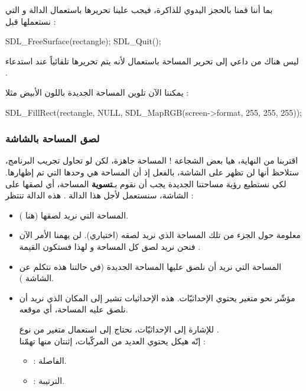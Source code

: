 بما أننا قمنا بالحجز اليدوي للذاكرة، فيجب علينا تحريرها باستعمال الدالة 
و التي نستعملها قبل 
 :

\begin{Csource}
SDL_FreeSurface(rectangle);
SDL_Quit();
\end{Csource}

\begin{information}
ليس هناك من داعي إلى تحرير المساحة
باستعمال
لأنه يتم تحريرها تلقائياً عند استدعاء
.
\end{information}

يمكننا الآن تلوين المساحة الجديدة باللون الأبيض مثلا :

\begin{Csource}
SDL_FillRect(rectangle, NULL, SDL_MapRGB(screen->format, 255, 255, 255));
\end{Csource}

\subsubsection{لصق المساحة بالشاشة}

اقتربنا من النهاية، هيا بعض الشجاعة ! المساحة جاهزة، لكن لو تحاول تجريب البرنامج، ستلاحظ أنها لن تظهر على الشاشة، بالفعل إذ أن المساحة
هي وحدها التي تم إظهارها. لكي نستطيع رؤية مساحتنا الجديدة يجب أن نقوم بـ\textbf{تسوية}
المساحة، أي لصقها على الشاشة، سنستعمل لأجل هذا الدالة 
.
 هذه الدالة تنتظر :
 
\begin{itemize}
	\item المساحة التي نريد لصقها (هنا 
	).
	\item معلومة حول الجزء من تلك المساحة الذي نريد لصقه (اختياري). لن يهمنا الأمر الآن فنحن نريد لصق كل المساحة و لهذا فستكون القيمة
	.
	\item المساحة التي نريد أن نلصق عليها المساحة الجديدة (في حالتنا هذه نتكلم عن الشاشة 
	).
	\item مؤشّر نحو متغير يحتوي الإحداثيّات. هذه الإحداثيات تشير إلى المكان الذي نريد أن نلصق عليه المساحة، أي موقعه.
	
للإشارة إلى الإحداثيّات، نحتاج إلى استعمال متغير من نوع 
.\\
إنّه هيكل يحتوي العديد من المركّبات، إثنتان منها تهمّنا :
	\begin{itemize}
		\item {} : 
الفاصلة.
		\item {} : 
الترتيبة. 
	\end{itemize}	
\end{itemize}

